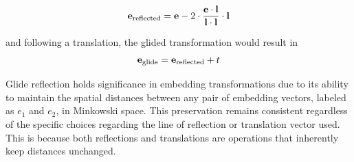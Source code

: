 \documentclass[letterpaper]{article} %
\begin{document}
\begin{equation}
\mathbf{e}_{\text{reflected}} = \mathbf{e} - 2 \cdot \frac{\mathbf{e} \cdot \mathbf{l}}{\mathbf{l} \cdot \mathbf{l}} \cdot \mathbf{l} \\
\label{eq:reflection}
\end{equation}

and following a translation, the glided transformation would result in 
\begin{equation}
\mathbf{e}_{\text{glide}} = \mathbf{e}_{\text{reflected}} + t\\
\label{eq:glide}
\end{equation}

Glide reflection holds significance in embedding transformations due to its ability to maintain the spatial distances between any pair of embedding vectors, labeled as $e_1$ and $e_2$, in Minkowski space. This preservation remains consistent regardless of the specific choices regarding the line of reflection or translation vector used. This is because both reflections and translations are operations that inherently keep distances unchanged.
\end{document}
